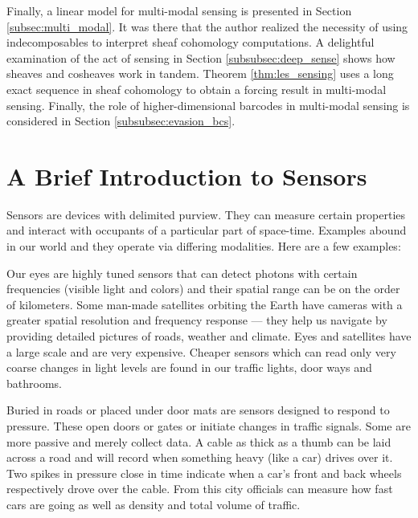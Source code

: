 Finally, a linear model for multi-modal sensing is presented in Section \ref{subsec:multi_modal}. It was there that the author realized the necessity of using indecomposables to interpret sheaf cohomology computations. A delightful examination of the act of sensing in Section \ref{subsubsec:deep_sense} shows how sheaves and cosheaves work in tandem. Theorem \ref{thm:les_sensing} uses a long exact sequence in sheaf cohomology to obtain a forcing result in multi-modal sensing. Finally, the role of higher-dimensional barcodes in multi-modal sensing is considered in Section \ref{subsubsec:evasion_bcs}. 

\section{A Brief Introduction to Sensors}
\label{subsec:sensors}

Sensors are devices with delimited purview. They can measure certain properties and interact with occupants of a particular part of space-time. Examples abound in our world and they operate via differing modalities. Here are a few examples:

\begin{ex}[Sight]
	Our eyes are highly tuned sensors that can detect photons with certain frequencies (visible light and colors) and their spatial range can be on the order of kilometers. Some man-made satellites orbiting the Earth have cameras with a greater spatial resolution and frequency response --- they help us navigate by providing detailed pictures of roads, weather and climate. Eyes and satellites have a large scale and are very expensive. Cheaper sensors which can read only very coarse changes in light levels are found in our traffic lights, door ways and bathrooms.
\end{ex}

\begin{ex}
	Buried in roads or placed under door mats are sensors designed to respond to pressure. These open doors or gates or initiate changes in traffic signals. Some are more passive and merely collect data. A cable as thick as a thumb can be laid across a road and will record when something heavy (like a car) drives over it. Two spikes in pressure close in time indicate when a car's front and back wheels respectively drove over the cable. From this city officials can measure how fast cars are going as well as density and total volume of traffic.
\end{ex}

